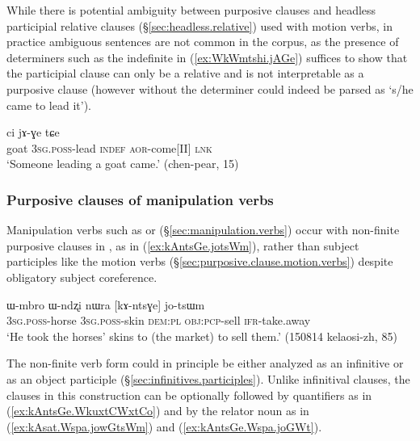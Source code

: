 While there is potential ambiguity between purposive clauses and headless participial relative clauses (§\ref{sec:headless.relative}) used with motion verbs, in practice ambiguous sentences are not common in the corpus, as the presence of determiners such as the indefinite  in (\ref{ex:WkWmtshi.jAGe}) suffices to show that the participial clause can only be a relative and is not interpretable as a purposive clause (however  without the determiner could indeed be parsed as `s/he came to lead it').

\begin{exe}
	\ex \label{ex:WkWmtshi.jAGe}
	 ci jɤ-ɣe tɕe \\
	goat \textsc{3sg}.\textsc{poss}-lead \textsc{indef} \textsc{aor}-come[II] \textsc{lnk} \\
	\glt `Someone leading a goat came.' (chen-pear, 15)
\end{exe}

\subsubsection{Purposive clauses of manipulation verbs} \label{sec:participial.clause.essive}
Manipulation verbs such as  or  (§\ref{sec:manipulation.verbs}) occur with non-finite purposive clauses in , as in (\ref{ex:kAntsGe.jotsWm}), rather than subject participles like the motion verbs (§\ref{sec:purposive.clause.motion.verbs}) despite obligatory subject coreference.

\begin{exe}
	\ex \label{ex:kAntsGe.jotsWm}
	\gll ɯ-mbro ɯ-ndʐi nɯra [kɤ-ntsɣe] jo-tsɯm \\
	\textsc{3sg}.\textsc{poss}-horse \textsc{3sg}.\textsc{poss}-skin \textsc{dem}:\textsc{pl} \textsc{obj}:\textsc{pcp}-sell \textsc{ifr}-take.away \\
	\glt `He took the horses' skins to (the market) to sell them.' (150814 kelaosi-zh, 85)
\end{exe}

The non-finite verb form  could in principle be either analyzed as an infinitive or as an object participle (§\ref{sec:infinitives.participles}). Unlike infinitival clauses, the  clauses in this construction can be optionally followed by quantifiers as in (\ref{ex:kAntsGe.WkuxtCWxtCo}) and by the relator noun  as in (\ref{ex:kAsat.Wspa.jowGtsWm}) and (\ref{ex:kAntsGe.Wspa.joGWt}). 

